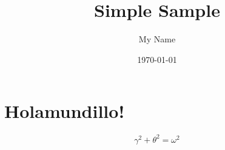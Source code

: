 \documentclass{article} %
\title{Simple Sample} %
\author{My Name} %
\date{\today} %
\begin{document}
\maketitle %

\section{Holamundillo!} %


\begin{equation} %
  \gamma^2+\theta^2=\omega^2
\end{equation}
\end{document}
